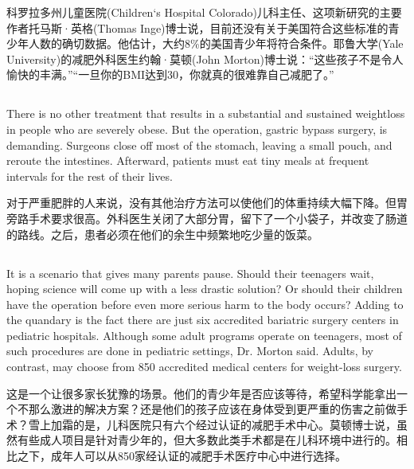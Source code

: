 \documentclass[]{article}
\begin{document}
科罗拉多州儿童医院(Children‘s Hospital Colorado)儿科主任、这项新研究的主要作者托马斯·英格(Thomas Inge)博士说，目前还没有关于美国符合这些标准的青少年人数的确切数据。他估计，大约8\%的美国青少年将符合条件。耶鲁大学(Yale University)的减肥外科医生约翰·莫顿(John Morton)博士说：“这些孩子不是令人愉快的丰满。”“一旦你的BMI达到30，你就真的很难靠自己减肥了。”

\subsection{}
\begin{spacing}{2.0}
	{\Large There is no other treatment that results in a substantial and sustained weightloss in people who are severely obese. But the operation, gastric bypass surgery, is demanding. Surgeons close off most of the stomach, leaving a small pouch, and reroute the intestines. Afterward, patients must eat tiny meals at frequent intervals for the rest of their lives.}\newline
\end{spacing}

对于严重肥胖的人来说，没有其他治疗方法可以使他们的体重持续大幅下降。但胃旁路手术要求很高。外科医生关闭了大部分胃，留下了一个小袋子，并改变了肠道的路线。之后，患者必须在他们的余生中频繁地吃少量的饭菜。

\subsection{}
\begin{spacing}{2.0}
	{\Large It is a scenario that gives many parents pause. Should their teenagers wait, hoping science will come up with a less drastic solution? Or should their children have the operation before even more serious harm to the body occurs? Adding to the quandary is the fact there are just six accredited bariatric surgery centers in pediatric hospitals. Although some adult programs operate on teenagers, most of such procedures are done in pediatric settings, Dr. Morton said. Adults, by contrast, may choose from 850 accredited medical centers for weight-loss surgery.}\newline
\end{spacing}

这是一个让很多家长犹豫的场景。他们的青少年是否应该等待，希望科学能拿出一个不那么激进的解决方案？还是他们的孩子应该在身体受到更严重的伤害之前做手术？雪上加霜的是，儿科医院只有六个经过认证的减肥手术中心。莫顿博士说，虽然有些成人项目是针对青少年的，但大多数此类手术都是在儿科环境中进行的。相比之下，成年人可以从850家经认证的减肥手术医疗中心中进行选择。
\end{document}
